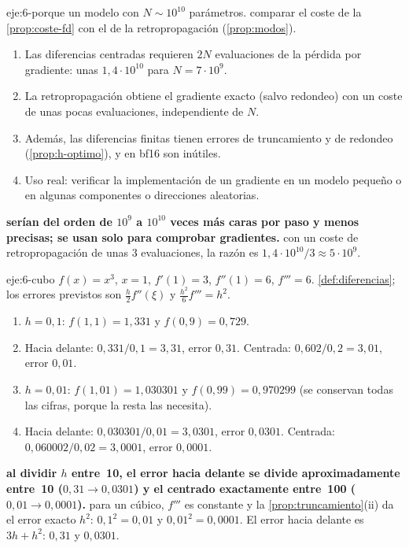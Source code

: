 \begin{solucion}{eje:6-porque}
\datos un modelo con $N\sim 10^{10}$ parámetros.
\planteamiento comparar el coste de la \cref{prop:coste-fd} con el de la retropropagación (\cref{prop:modos}).
\pasos
\begin{enumerate}[label=\arabic*.]
  \item Las diferencias centradas requieren $2N$ evaluaciones de la pérdida por gradiente: unas $1{,}4\cdot 10^{10}$ para $N=7\cdot 10^{9}$.
  \item La retropropagación obtiene el gradiente exacto (salvo redondeo) con un coste de unas pocas evaluaciones, independiente de $N$.
  \item Además, las diferencias finitas tienen errores de truncamiento y de redondeo (\cref{prop:h-optimo}), y en bf16 son inútiles.
  \item Uso real: verificar la implementación de un gradiente en un modelo pequeño o en algunas componentes o direcciones aleatorias.
\end{enumerate}
\resultado \textbf{serían del orden de $10^{9}$ a $10^{10}$ veces más caras por paso y menos precisas; se usan solo para comprobar gradientes.}
\comprobacion con un coste de retropropagación de unas 3 evaluaciones, la razón es $1{,}4\cdot 10^{10}/3\approx 5\cdot 10^{9}$.
\end{solucion}

\begin{solucion}{eje:6-cubo}
\datos $f(x)=x^{3}$, $x=1$, $f'(1)=3$, $f''(1)=6$, $f'''=6$.
\planteamiento \cref{def:diferencias}; los errores previstos son $\tfrac h2f''(\xi)$ y $\tfrac{h^{2}}{6}f'''=h^{2}$.
\pasos
\begin{enumerate}[label=\arabic*.]
  \item $h=0{,}1$: $f(1{,}1)=1{,}331$ y $f(0{,}9)=0{,}729$.
  \item Hacia delante: $0{,}331/0{,}1=3{,}31$, error $0{,}31$. Centrada: $0{,}602/0{,}2=3{,}01$, error $0{,}01$.
  \item $h=0{,}01$: $f(1{,}01)=1{,}030301$ y $f(0{,}99)=0{,}970299$ (se conservan todas las cifras, porque la resta las necesita).
  \item Hacia delante: $0{,}030301/0{,}01=3{,}0301$, error $0{,}0301$. Centrada: $0{,}060002/0{,}02=3{,}0001$, error $0{,}0001$.
\end{enumerate}
\resultado \textbf{al dividir $h$ entre~10, el error hacia delante se divide aproximadamente entre~10 ($0{,}31\to 0{,}0301$) y el centrado exactamente entre~100 ($0{,}01\to 0{,}0001$).}
\comprobacion para un cúbico, $f'''$ es constante y la \cref{prop:truncamiento}(ii) da el error exacto $h^{2}$: $0{,}1^{2}=0{,}01$ y $0{,}01^{2}=0{,}0001$. El error hacia delante es $3h+h^{2}$: $0{,}31$ y $0{,}0301$.
\end{solucion}

